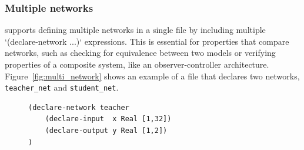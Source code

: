 \subsubsection*{Multiple networks}
\label{sec:multi-network-declarations}
\vnnlib{} supports defining multiple networks in a single file by including multiple `(declare-network ...)` expressions. This is essential for properties that compare networks, 
such as checking for equivalence between two models or verifying properties of a composite system, like an observer-controller architecture. Figure~\ref{fig:multi_network} 
shows an example of a \vnnlib{} file that declares two networks, \texttt{teacher\_net} and \texttt{student\_net}.

\begin{figure}[h!]
    \begin{minipage}[c]{0.57\textwidth}
        \begin{lstlisting}[style=lbnf]
(declare-network teacher
    (declare-input  x Real [1,32])
    (declare-output y Real [1,2])
)


\end{lstlisting}
\end{minipage}
\end{figure}
